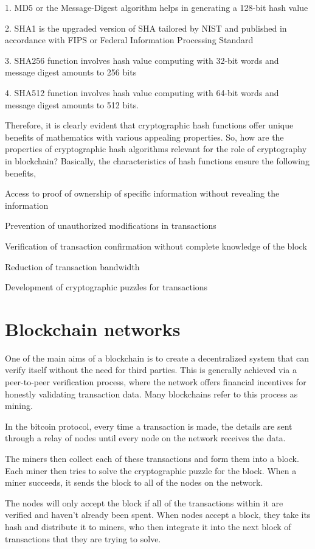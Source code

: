 \documentclass[BTech]{srmuthesis}
\begin{document}
  1. MD5 or the Message-Digest algorithm helps in generating a 128-bit hash value

  2. SHA1 is the upgraded version of SHA tailored by NIST and published in accordance with FIPS or Federal Information Processing Standard

  3. SHA256 function involves hash value computing with 32-bit words and message digest amounts to 256 bits

  4. SHA512 function involves hash value computing with 64-bit words and message digest amounts to 512 bits.

  Therefore, it is clearly evident that cryptographic hash functions offer unique benefits of mathematics with various appealing properties. So, how are the properties of cryptographic hash algorithms relevant for the role of cryptography in blockchain? Basically, the characteristics of hash functions ensure the following benefits,

  Access to proof of ownership of specific information without revealing the information

  Prevention of unauthorized modifications in transactions

  Verification of transaction confirmation without complete knowledge of the block

  Reduction of transaction bandwidth

  Development of cryptographic puzzles for transactions
  \section{Blockchain networks}
  One of the main aims of a blockchain is to create a decentralized system that can verify itself without the need for third parties. This is generally achieved via a peer-to-peer verification process, where the network offers financial incentives for honestly validating transaction data. Many blockchains refer to this process as mining.

  In the bitcoin protocol, every time a transaction is made, the details are sent through a relay of nodes until every node on the network receives the data.

  The miners then collect each of these transactions and form them into a block. Each miner then tries to solve the cryptographic puzzle for the block. When a miner succeeds, it sends the block to all of the nodes on the network.

  The nodes will only accept the block if all of the transactions within it are verified and haven’t already been spent. When nodes accept a block, they take its hash and distribute it to miners, who then integrate it into the next block of transactions that they are trying to solve.
\end{document}
